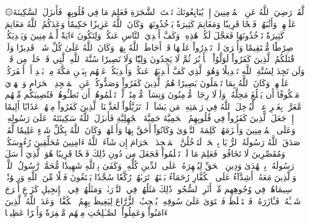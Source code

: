 ۞لَّقَدۡ رَضِيَ ٱللَّهُ عَنِ ٱلۡمُؤۡمِنِينَ إِذۡ يُبَايِعُونَكَ تَحۡتَ ٱلشَّجَرَةِ فَعَلِمَ مَا فِي قُلُوبِهِمۡ فَأَنزَلَ ٱلسَّكِينَةَ عَلَيۡهِمۡ وَأَثَٰبَهُمۡ فَتۡحٗا قَرِيبٗا
وَمَغَانِمَ كَثِيرَةٗ يَأۡخُذُونَهَاۗ وَكَانَ ٱللَّهُ عَزِيزًا حَكِيمٗا
وَعَدَكُمُ ٱللَّهُ مَغَانِمَ كَثِيرَةٗ تَأۡخُذُونَهَا فَعَجَّلَ لَكُمۡ هَٰذِهِۦ وَكَفَّ أَيۡدِيَ ٱلنَّاسِ عَنكُمۡ وَلِتَكُونَ ءَايَةٗ لِّلۡمُؤۡمِنِينَ وَيَهۡدِيَكُمۡ صِرَٰطٗا مُّسۡتَقِيمٗا
وَأُخۡرَىٰ لَمۡ تَقۡدِرُواْ عَلَيۡهَا قَدۡ أَحَاطَ ٱللَّهُ بِهَاۚ وَكَانَ ٱللَّهُ عَلَىٰ كُلِّ شَيۡءٖ قَدِيرٗا
وَلَوۡ قَٰتَلَكُمُ ٱلَّذِينَ كَفَرُواْ لَوَلَّوُاْ ٱلۡأَدۡبَٰرَ ثُمَّ لَا يَجِدُونَ وَلِيّٗا وَلَا نَصِيرٗا
سُنَّةَ ٱللَّهِ ٱلَّتِي قَدۡ خَلَتۡ مِن قَبۡلُۖ وَلَن تَجِدَ لِسُنَّةِ ٱللَّهِ تَبۡدِيلٗا
وَهُوَ ٱلَّذِي كَفَّ أَيۡدِيَهُمۡ عَنكُمۡ وَأَيۡدِيَكُمۡ عَنۡهُم بِبَطۡنِ مَكَّةَ مِنۢ بَعۡدِ أَنۡ أَظۡفَرَكُمۡ عَلَيۡهِمۡۚ وَكَانَ ٱللَّهُ بِمَا تَعۡمَلُونَ بَصِيرًا
هُمُ ٱلَّذِينَ كَفَرُواْ وَصَدُّوكُمۡ عَنِ ٱلۡمَسۡجِدِ ٱلۡحَرَامِ وَٱلۡهَدۡيَ مَعۡكُوفًا أَن يَبۡلُغَ مَحِلَّهُۥۚ وَلَوۡلَا رِجَالٞ مُّؤۡمِنُونَ وَنِسَآءٞ مُّؤۡمِنَٰتٞ لَّمۡ تَعۡلَمُوهُمۡ أَن تَطَـُٔوهُمۡ فَتُصِيبَكُم مِّنۡهُم مَّعَرَّةُۢ بِغَيۡرِ عِلۡمٖۖ لِّيُدۡخِلَ ٱللَّهُ فِي رَحۡمَتِهِۦ مَن يَشَآءُۚ لَوۡ تَزَيَّلُواْ لَعَذَّبۡنَا ٱلَّذِينَ كَفَرُواْ مِنۡهُمۡ عَذَابًا أَلِيمًا
إِذۡ جَعَلَ ٱلَّذِينَ كَفَرُواْ فِي قُلُوبِهِمُ ٱلۡحَمِيَّةَ حَمِيَّةَ ٱلۡجَٰهِلِيَّةِ فَأَنزَلَ ٱللَّهُ سَكِينَتَهُۥ عَلَىٰ رَسُولِهِۦ وَعَلَى ٱلۡمُؤۡمِنِينَ وَأَلۡزَمَهُمۡ كَلِمَةَ ٱلتَّقۡوَىٰ وَكَانُوٓاْ أَحَقَّ بِهَا وَأَهۡلَهَاۚ وَكَانَ ٱللَّهُ بِكُلِّ شَيۡءٍ عَلِيمٗا
لَّقَدۡ صَدَقَ ٱللَّهُ رَسُولَهُ ٱلرُّءۡيَا بِٱلۡحَقِّۖ لَتَدۡخُلُنَّ ٱلۡمَسۡجِدَ ٱلۡحَرَامَ إِن شَآءَ ٱللَّهُ ءَامِنِينَ مُحَلِّقِينَ رُءُوسَكُمۡ وَمُقَصِّرِينَ لَا تَخَافُونَۖ فَعَلِمَ مَا لَمۡ تَعۡلَمُواْ فَجَعَلَ مِن دُونِ ذَٰلِكَ فَتۡحٗا قَرِيبًا
هُوَ ٱلَّذِيٓ أَرۡسَلَ رَسُولَهُۥ بِٱلۡهُدَىٰ وَدِينِ ٱلۡحَقِّ لِيُظۡهِرَهُۥ عَلَى ٱلدِّينِ كُلِّهِۦۚ وَكَفَىٰ بِٱللَّهِ شَهِيدٗا
مُّحَمَّدٞ رَّسُولُ ٱللَّهِۚ وَٱلَّذِينَ مَعَهُۥٓ أَشِدَّآءُ عَلَى ٱلۡكُفَّارِ رُحَمَآءُ بَيۡنَهُمۡۖ تَرَىٰهُمۡ رُكَّعٗا سُجَّدٗا يَبۡتَغُونَ فَضۡلٗا مِّنَ ٱللَّهِ وَرِضۡوَٰنٗاۖ سِيمَاهُمۡ فِي وُجُوهِهِم مِّنۡ أَثَرِ ٱلسُّجُودِۚ ذَٰلِكَ مَثَلُهُمۡ فِي ٱلتَّوۡرَىٰةِۚ وَمَثَلُهُمۡ فِي ٱلۡإِنجِيلِ كَزَرۡعٍ أَخۡرَجَ شَطۡـَٔهُۥ فَـَٔازَرَهُۥ فَٱسۡتَغۡلَظَ فَٱسۡتَوَىٰ عَلَىٰ سُوقِهِۦ يُعۡجِبُ ٱلزُّرَّاعَ لِيَغِيظَ بِهِمُ ٱلۡكُفَّارَۗ وَعَدَ ٱللَّهُ ٱلَّذِينَ ءَامَنُواْ وَعَمِلُواْ ٱلصَّـٰلِحَٰتِ مِنۡهُم مَّغۡفِرَةٗ وَأَجۡرًا عَظِيمَۢا